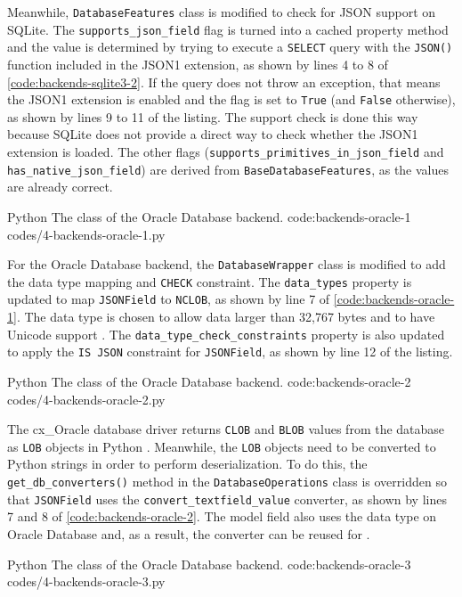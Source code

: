 Meanwhile, \verb|DatabaseFeatures| class is modified to check for JSON support
on SQLite. The \verb|supports_json_field| flag is turned into a cached property
method and the value is determined by trying to execute a \verb|SELECT| query
with the \verb|JSON()| function included in the JSON1 extension, as shown by
lines 4 to 8 of \autoref{code:backends-sqlite3-2}. If the query does not throw
an exception, that means the JSON1 extension is enabled and the flag is set to
\verb|True| (and \verb|False| otherwise), as shown by lines 9 to 11 of the
listing. The support check is done this way because SQLite does not provide a
direct way to check whether the JSON1 extension is loaded. The other
flags (\verb|supports_primitives_in_json_field| and
\verb|has_native_json_field|) are derived from \verb|BaseDatabaseFeatures|, as
the values are already correct.

\listing
{Python}
{The  class of the Oracle Database backend.}
{code:backends-oracle-1}
{codes/4-backends-oracle-1.py}

For the Oracle Database backend, the \verb|DatabaseWrapper| class is modified
to add the data type mapping and \verb|CHECK| constraint. The \verb|data_types|
property is updated to map \verb|JSONField| to \verb|NCLOB|, as shown by line 7
of \autoref{code:backends-oracle-1}. The  data type is chosen to
allow data larger than 32,767 bytes and to have Unicode support
\cite{oracle:overview-json, oracle:database-concepts}. The
\verb|data_type_check_constraints| property is also updated to apply the
\verb|IS JSON| constraint for \verb|JSONField|, as shown by line 12 of the
listing.

\listing
{Python}
{The  class of the Oracle Database backend.}
{code:backends-oracle-2}
{codes/4-backends-oracle-2.py}

The cx\_Oracle database driver returns \verb|CLOB| and \verb|BLOB| values from
the database as \verb|LOB| objects in Python \cite{cxoracle:lob}. Meanwhile,
the \verb|LOB| objects need to be converted to Python strings in order to
perform deserialization. To do this, the \verb|get_db_converters()| method in
the \verb|DatabaseOperations| class is overridden so that \verb|JSONField| uses
the \verb|convert_textfield_value| converter, as shown by lines 7 and 8 of
\autoref{code:backends-oracle-2}. The  model field also uses
the  data type on Oracle Database and, as a result, the converter
can be reused for .

\listing
{Python}
{The  class of the Oracle Database backend.}
{code:backends-oracle-3}
{codes/4-backends-oracle-3.py}

